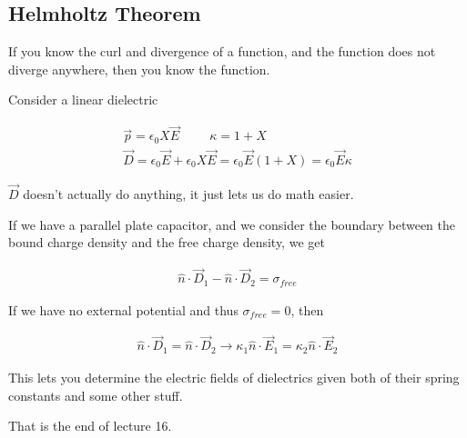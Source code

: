 \documentclass[fleqn]{report}
\newcommand{\hp}{\hspace{1cm}}
\newcommand{\equations} [1] {
\begin{gather*}
#1
\end{gather*}
}
\begin{document}
\subsection{Helmholtz Theorem}
If you know the curl and divergence of a function, and the function does 
not diverge anywhere, then you know the function.

Consider a linear dielectric 
\equations{
    \vec p = \epsilon_0 X \vec E 
    \hp 
    \kappa = 1 + X 
    \\
    \vec D 
    = 
    \epsilon_0 \vec E + \epsilon_0 X \vec E 
    =
    \epsilon_0 \vec E (1 + X)
    =
    \epsilon_0 \vec E \kappa 
}

$\vec D$ doesn't actually do anything, it just lets us do math easier. 

If we have a parallel plate capacitor, and we consider the boundary between 
the bound charge density and the free charge density, we get 
\equations{
    \hat n \cdot \vec D_1 - \hat n \cdot \vec D_2 = \sigma_{free}
}

If we have no external potential and thus $\sigma_{free} = 0$, then 
\equations{
    \hat n \cdot \vec D_1 = \hat n \cdot \vec D_2 
    \rightarrow 
    \kappa_1 \hat n \cdot \vec E_1  = \kappa_2 \hat n \cdot \vec E_2
}

This lets you determine the electric fields of dielectrics given 
both of their spring constants and some other stuff. 

That is the end of lecture 16. 
\end{document}
